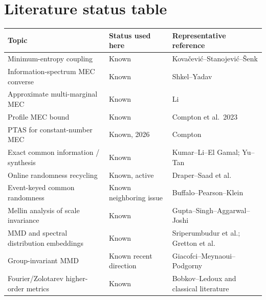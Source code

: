 \documentclass[11pt,a4paper]{article}
\newcommand{\1}{\mathbf 1}
\begin{document}
\section{Literature status table}

\begin{center}
\renewcommand{\arraystretch}{1.25}
\begin{tabular}{
>{\raggedright\arraybackslash}p{}
>{\raggedright\arraybackslash}p{}
>{\raggedright\arraybackslash}p{}
}
\toprule
Topic & Status used here & Representative reference
\\
\midrule

Minimum-entropy coupling
&
Known
&
Kovačević--Stanojević--Šenk
\\

Information-spectrum MEC converse
&
Known
&
Shkel--Yadav
\\

Approximate multi-marginal MEC
&
Known
&
Li
\\

Profile MEC bound
&
Known
&
Compton et al.\ 2023
\\

PTAS for constant-number MEC
&
Known, 2026
&
Compton
\\

Exact common information / synthesis
&
Known
&
Kumar--Li--El Gamal; Yu--Tan
\\

Online randomness recycling
&
Known, active
&
Draper--Saad et al.
\\

Event-keyed common randomness
&
Known neighboring issue
&
Buffalo--Pearson--Klein
\\

Mellin analysis of scale invariance
&
Known
&
Gupta--Singh--Aggarwal--Joshi
\\

MMD and spectral distribution embeddings
&
Known
&
Sriperumbudur et al.; Gretton et al.
\\

Group-invariant MMD
&
Known recent direction
&
Giacofci--Meynaoui--Podgorny
\\

Fourier/Zolotarev higher-order metrics
&
Known
&
Bobkov--Ledoux and classical literature
\\


\end{tabular}
\end{center}
\end{document}
